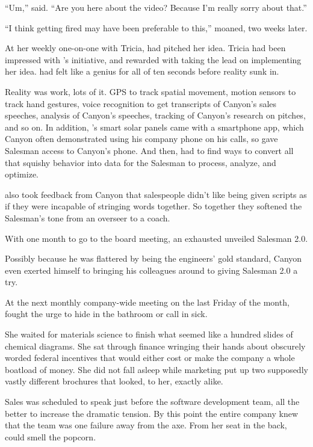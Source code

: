 \bigbreak

``Um,'' {\energyJerk} said. ``Are you here about the video? Because I'm really sorry about that.''

\bigbreak

``I think getting fired may have been preferable to this,'' {\protag} moaned, two weeks later.

At her weekly one-on-one with Tricia, {\protag} had pitched her idea. Tricia had been impressed with {\protag}'s initiative, and rewarded {\protag} with taking the lead on implementing her idea. {\protag} had felt like a genius for all of ten seconds before reality sunk in.

Reality was work, lots of it. GPS to track spatial movement, motion sensors to track hand gestures, voice recognition to get transcripts of Canyon's sales speeches, analysis of Canyon's speeches, tracking of Canyon's research on pitches, and so on. In addition, \energyCompany{}'s smart solar panels came with a smartphone app, which Canyon often demonstrated using his company phone on his calls, so {\protag} gave Salesman access to Canyon's phone. And then, {\protag} had to find ways to convert all that squishy behavior into data for the Salesman to process, analyze, and optimize.

{\protag} also took feedback from Canyon that salespeople didn't like being given scripts as if they were incapable of stringing words together. So together they softened the Salesman's tone from an overseer to a coach.

With one month to go to the board meeting, an exhausted {\protag} unveiled Salesman 2.0.

Possibly because he was flattered by being the engineers' gold standard, Canyon even exerted himself to bringing his colleagues around to giving Salesman 2.0 a try.

At the next monthly company-wide meeting on the last Friday of the month, {\protag} fought the urge to hide in the bathroom or call in sick.

She waited for materials science to finish what seemed like a hundred slides of chemical diagrams. She sat through finance wringing their hands about obscurely worded federal incentives that would either cost or make the company a whole boatload of money. She did not fall asleep while marketing put up two supposedly vastly different brochures that looked, to her, exactly alike.

Sales was scheduled to speak just before the software development team, all the better to increase the dramatic tension. By this point the entire company knew that the team was one failure away from the axe. From her seat in the back, {\protag} could smell the popcorn.

